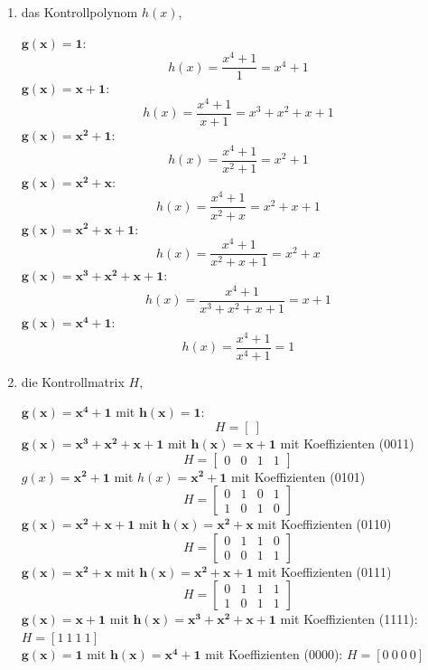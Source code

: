 \documentclass{article} %
\begin{document}
\begin{enumerate}
    \item das Kontrollpolynom $h(x)$,
    \begin{mybox}
    $\mathbf{g(x) = 1}$: 
    \[
    h(x) = \frac{x^4+1}{1} = x^4+1 
    \]
    $\mathbf{g(x) = x+1}$:
    \[
    h(x) = \frac{x^4+1}{x+1} =  x^3 + x^2 + x + 1
    \]
     $\mathbf{g(x) = x^2+1}$: 
    \[
    h(x) = \frac{x^4+1}{x^2+1} = x^2+1
    \]
     $\mathbf{g(x) = x^2+x}$:
    \[
    h(x) = \frac{x^4+1}{x^2+x} = x^2+x+1
    \]
     $\mathbf{g(x) = x^2+x+1}$:
    \[
    h(x) = \frac{x^4+1}{x^2+x+1} = x^2 +x
    \]
    $\mathbf{g(x) = x^3 + x^2 + x + 1}$:
    \[
    h(x) = \frac{x^4+1}{x^3 + x^2 + x + 1} = x+1
    \]
    $\mathbf{g(x) = x^4+1}$:
    \[
    h(x) = \frac{x^4+1}{x^4+1} = 1 
    \]
    \end{mybox}
    \item die Kontrollmatrix $H$,
    \begin{mybox}
     $\mathbf{g(x) = x^4+1}$ mit $\mathbf{h(x) = 1}$: 
    \[
    H = [\ ]
    \]
    $\mathbf{g(x) = x^3 + x^2 + x + 1}$ mit $\mathbf{h(x) = x+1}$ mit Koeffizienten (0011)
    \[
    H = 
    \begin{bmatrix}
     0 & 0 & 1 & 1
\end{bmatrix}
    \]
    $g(x) = \mathbf{x^2+1}$ mit $h(x) = \mathbf{x^2+1}$ mit Koeffizienten  (0101)
    \[
    H = 
    \begin{bmatrix}
     0&1&0&1 \\
    1&0&1&0 
    \end{bmatrix}
    \]
    $\mathbf{g(x) = x^2+x+1}$ mit $\mathbf{h(x) = x^2+x}$ mit Koeffizienten  (0110)
   \[
    H = 
      \begin{bmatrix}
      0 & 1 & 1 & 0  \\
    0 & 0 & 1 & 1
\end{bmatrix}
    \]
    $\mathbf{g(x) = x^2+x}$ mit  $\mathbf{h(x) = x^2+x+1}$ mit Koeffizienten (0111)
    \[
    H = 
\begin{bmatrix}
0&1&1&1 \\
1&0&1&1
\end{bmatrix}
    \]
   $\mathbf{g(x) = x+1}$ mit  $\mathbf{h(x) = x^3 + x^2 + x + 1}$ mit Koeffizienten (1111): \(H = [1 \ 1 \ 1 \ 1]\) \\
     $\mathbf{g(x) = 1}$ mit $\mathbf{h(x) = x^4+1}$ mit Koeffizienten (0000): \(H = [0 \ 0 \ 0 \ 0]\)

\end{mybox}
\end{enumerate}
\end{document}
